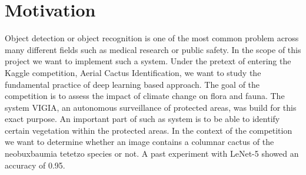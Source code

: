 \newcommand{\feat}{\texttt}







\section{Motivation}
Object detection or object recognition is one of the most common problem across many different fields such as medical research or public safety. In the scope of this project we want to implement such a system. Under the pretext of entering the Kaggle competition, Aerial Cactus Identification, we want to study the fundamental practice of deep learning based approach. The goal of the competition is to assess the impact of climate change on flora and fauna. The system VIGIA, an autonomous surveillance of protected areas, was build for this exact purpose. An important part of such as system is to be able to identify certain vegetation within the protected areas. In the context of the competition we want to determine whether an image contains a columnar cactus of the neobuxbaumia tetetzo species or not. A past experiment with LeNet-5 showed an accuracy of 0.95.

